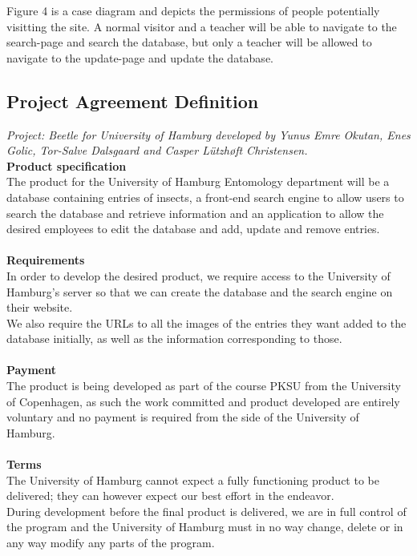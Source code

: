 \documentclass[12pt,a4paper]{article}
\begin{document}
Figure 4 is a case diagram and depicts the permissions of people potentially visitting the site. 
A normal visitor and a teacher will be able to navigate to the search-page and search the database, but only a teacher will be allowed to navigate to the update-page and update the database.

\newpage
\subsection{Project Agreement Definition}
\textit{Project: Beetle for University of Hamburg developed by Yunus Emre Okutan, Enes Golic, Tor-Salve Dalsgaard and Casper Lützhøft Christensen.}\\

\textbf{Product specification}\\
The product for the University of Hamburg Entomology department will be a database containing entries of insects, a front-end search engine to allow users to search the database and retrieve information and an application to allow the desired employees to edit the database and add, update and remove entries.\\\\
\textbf{Requirements}\\
In order to develop the desired product, we require access to the University of Hamburg’s server so that we can create the database and the search engine on their website. \\
We also require the URLs to all the images of the entries they want added to the database initially, as well as the information corresponding to those.\\\\
\textbf{Payment}\\
The product is being developed as part of the course PKSU from the University of Copenhagen, as such the work committed and product developed are entirely voluntary and no payment is required from the side of the University of Hamburg.\\\\
\textbf{Terms}\\
The University of Hamburg cannot expect a fully functioning product to be delivered; they can however expect our best effort in the endeavor.\\
During development before the final product is delivered, we are in full control of the program and the University of Hamburg must in no way change, delete or in any way modify any parts of the program.\\
\end{document}
